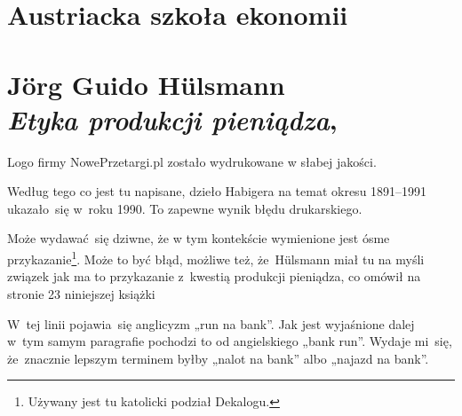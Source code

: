 \documentclass[a4paper,11pt]{article}
\numberwithin{equation}{section}
\begin{document}
\section{Austriacka szkoła ekonomii}

\VerSpaceTwo



\section{ %
  J\"{o}rg Guido H\"{u}lsmann \\
  \textit{Etyka produkcji pieniądza},
  \cite{HulsmannEtykaProdukcjiPieniadza2014}}

\vspace{0em}



\vspace{0em}


\noindent
{} Logo firmy NowePrzetargi.pl zostało wydrukowane w słabej jakości.

\VerSpaceFour





\noindent
{} Według tego co jest tu napisane, dzieło Habigera na
temat okresu 1891--1991 ukazało~się w~roku 1990. To zapewne wynik błędu
drukarskiego.

\VerSpaceFour





\noindent
{} Może wydawać~się dziwne, że w tym kontekście
wymienione jest
ósme przykazanie\footnote{Używany jest tu katolicki podział Dekalogu.}. Może
to być błąd, możliwe też, że~H\"{u}lsmann miał tu na myśli związek jak ma to
przykazanie z~kwestią produkcji pieniądza, co omówił na stronie 23
niniejszej książki

\VerSpaceFour





\noindent
{} W~tej linii pojawia~się anglicyzm „run na bank”. Jak
jest
wyjaśnione dalej w~tym samym paragrafie pochodzi to od angielskiego „bank
run”. Wydaje mi~się, że~znacznie lepszym terminem byłby „nalot na bank” albo
„najazd na bank”.

\VerSpaceFour
\end{document}
